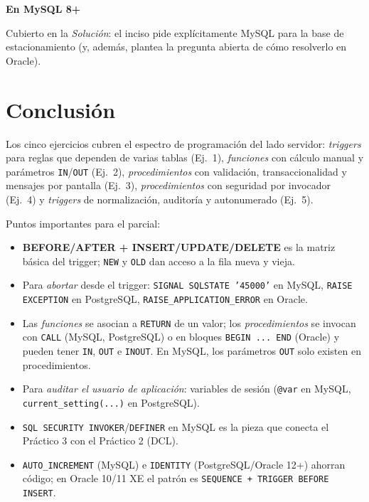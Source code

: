 \documentclass[11pt,a4paper]{article}
\newcommand{\itemcabecera}[1]{\noindent\textbf{#1}\par\medskip}
\newcommand{\bloqueMySQL}{\itemcabecera{En MySQL 8+}}
\begin{document}
\bloqueMySQL

Cubierto en la \textit{Solución}: el inciso pide explícitamente MySQL para la base de estacionamiento (y, además, plantea la pregunta abierta de cómo resolverlo en Oracle).

\section*{Conclusión}

Los cinco ejercicios cubren el espectro de programación del lado servidor: \emph{triggers} para reglas que dependen de varias tablas (Ej.~1), \emph{funciones} con cálculo manual y parámetros \texttt{IN}/\texttt{OUT} (Ej.~2), \emph{procedimientos} con validación, transaccionalidad y mensajes por pantalla (Ej.~3), \emph{procedimientos} con seguridad por invocador (Ej.~4) y \emph{triggers} de normalización, auditoría y autonumerado (Ej.~5).

Puntos importantes para el parcial:

\begin{itemize}
    \item \textbf{BEFORE/AFTER + INSERT/UPDATE/DELETE} es la matriz básica del trigger; \texttt{NEW} y \texttt{OLD} dan acceso a la fila nueva y vieja.
    \item Para \emph{abortar} desde el trigger: \texttt{SIGNAL SQLSTATE '45000'} en MySQL, \texttt{RAISE EXCEPTION} en PostgreSQL, \texttt{RAISE\_APPLICATION\_ERROR} en Oracle.
    \item Las \emph{funciones} se asocian a \texttt{RETURN} de un valor; los \emph{procedimientos} se invocan con \texttt{CALL} (MySQL, PostgreSQL) o en bloques \texttt{BEGIN ... END} (Oracle) y pueden tener \texttt{IN}, \texttt{OUT} e \texttt{INOUT}. En MySQL, los parámetros \texttt{OUT} solo existen en procedimientos.
    \item Para \emph{auditar el usuario de aplicación}: variables de sesión (\texttt{@var} en MySQL, \texttt{current\_setting(...)} en PostgreSQL).
    \item \texttt{SQL SECURITY INVOKER}/\texttt{DEFINER} en MySQL es la pieza que conecta el Práctico 3 con el Práctico 2 (DCL).
    \item \texttt{AUTO\_INCREMENT} (MySQL) e \texttt{IDENTITY} (PostgreSQL/Oracle 12+) ahorran código; en Oracle 10/11 XE el patrón es \texttt{SEQUENCE + TRIGGER BEFORE INSERT}.
\end{itemize}
\end{document}
